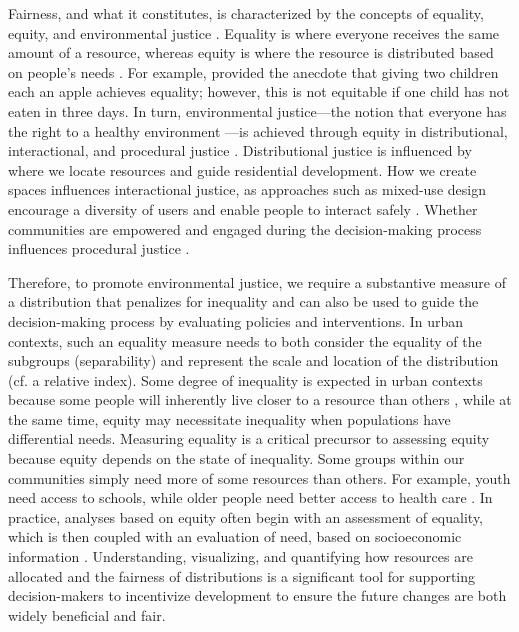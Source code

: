 \documentclass[final,3p,times,onecolumn,sort&compress]{elsarticle}
\begin{document}
Fairness, and what it constitutes, is characterized by the concepts of equality, equity, and environmental justice \citep{Talen1998-mk, Low2013-yx, Rigolon2019-zr, Lopez2011-cc}.
Equality is where everyone receives the same amount of a resource, whereas equity is where the resource is distributed based on people's needs \citep{Talen1998-mk, Lucy1981-xr}.
For example, \cite{Rumley2014-pu} provided the anecdote that giving two children each an apple achieves equality; however, this is not equitable if one child has not eaten in three days. 
In turn, environmental justice---the notion that everyone has the right to a healthy environment \citep{Lopez2011-cc}---is achieved through equity in distributional, interactional, and procedural justice \citep{Low2013-yx}.
Distributional justice is influenced by where we locate resources and guide residential development.
How we create spaces influences interactional justice, as approaches such as mixed-use design encourage a diversity of users and enable people to interact safely \citep{Jacobs1961-po}.
Whether communities are empowered and engaged during the decision-making process influences procedural justice \citep{Low2013-yx, Rigolon2019-zr}.

Therefore, to promote environmental justice, we require a substantive measure of a distribution that penalizes for inequality and can also be used to guide the decision-making process by evaluating policies and interventions.
In urban contexts, such an equality measure needs to both consider the equality of the subgroups (separability) and represent the scale and location of the distribution (cf. a relative index). 
Some degree of inequality is expected in urban contexts because some people will inherently live closer to a resource than others \citep{Dadashpoor2016-ar, Nesbitt2019-sk}, while at the same time, equity may necessitate inequality when populations have differential needs. 
Measuring equality is a critical precursor to assessing equity because equity depends on the state of inequality. 
Some groups within our communities simply need more of some resources than others. 
For example, youth need access to schools, while older people need better access to health care \citep{Syed2013-aj}. 
In practice, analyses based on equity often begin with an assessment of equality, which is then coupled with an evaluation of need, based on socioeconomic information \citep{Talen1998-mk, Whitehead2019-tf, Schwarz2015-fs, Harlan2006-ap}.
Understanding, visualizing, and quantifying how resources are allocated and the fairness of distributions is a significant tool for supporting decision-makers to incentivize development to ensure the future changes are both widely beneficial and fair. 
\end{document}

